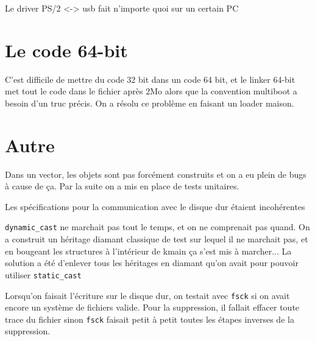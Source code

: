 \documentclass[12pt]{report}
\begin{document}
Le driver PS/2 <-> usb fait n'importe quoi sur un certain PC

\section*{Le code 64-bit}

C'est difficile de mettre du code 32 bit dans un code 64 bit, et le linker 64-bit met tout le code dans le fichier après 2Mo alors que la convention multiboot a besoin d'un truc précis.
On a résolu ce problème en faisant un loader maison.

\section*{Autre}

Dans un vector, les objets sont pas forcément construits et on a eu plein de bugs à cause de ça.
Par la suite on a mis en place de tests unitaires.

Les spécifications pour la communication avec le disque dur étaient incohérentes

\verb$dynamic_cast$ ne marchait pas tout le temps, et on ne comprenait pas quand. On a construit un héritage diamant classique de test sur lequel il ne marchait pas, et en bougeant les structures à l'intérieur de kmain ça s'est mis à marcher...
La solution a été d'enlever tous les héritages en diamant qu'on avait pour pouvoir utiliser \verb$static_cast$

Lorsqu'on faisait l'écriture sur le disque dur, on testait avec \verb$fsck$ si on avait encore un système de fichiers valide. Pour la suppression, il fallait effacer toute trace du fichier sinon \verb$fsck$ faisait petit à petit toutes les étapes inverses de la suppression.





\end{document}

